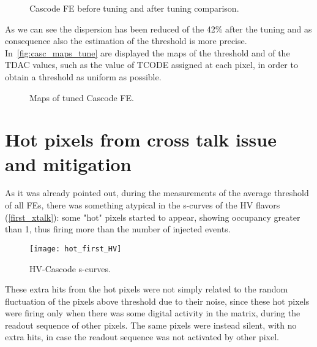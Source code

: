 \begin{figure}[h!]
\centering
{}
\caption{Cascode FE before tuning and after tuning comparison.}
\label{fig:casc_tuning}
\end{figure}

As we can see the dispersion has been reduced of the 42\% after the tuning and as consequence also the estimation of the threshold is more precise. In~\autoref{fig:casc_maps_tune} are displayed the maps of the threshold and of the TDAC values, such as the value of TCODE assigned at each pixel, in order to obtain a threshold as uniform as possible. \\

\begin{figure}[h!]
\centering
{}\quad
{}\quad
\caption{Maps of tuned Cascode FE.}
\label{fig:casc_maps_tune}
\end{figure}


\section{Hot pixels from cross talk issue and mitigation} \label{sec:xtalk}

As it was already pointed out, during the measurements of the average threshold of all FEs, there was something atypical in the s-curves of the HV flavors (\autoref{first_xtalk}): some "hot" pixels started to appear, showing occupancy greater than 1, thus firing more than the number of injected events. 

\begin{figure}[h!]
\centering
\texttt{[image: hot\_first\_HV]}
\caption{HV-Cascode s-curves.}
\label{fig:hot_first}
\end{figure}

These extra hits from the hot pixels were not simply related to the random fluctuation of the pixels above threshold due to their noise, since these hot pixels were firing only when there was some digital activity in the matrix, during the readout sequence of other pixels. The same pixels were instead silent, with no extra hits, in case the readout sequence was not activated by other pixel. 

